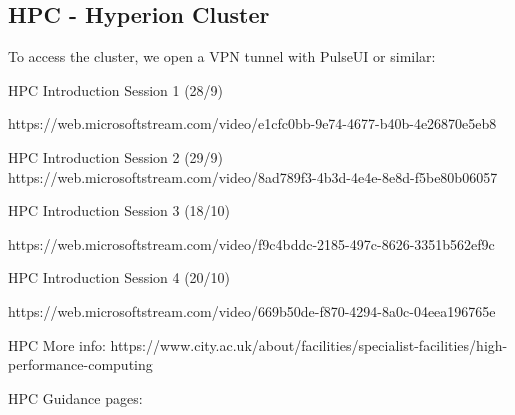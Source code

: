 \subsection{HPC - Hyperion Cluster}
To access the cluster, we open a VPN tunnel with PulseUI or similar:








HPC Introduction Session 1 (28/9)

https://web.microsoftstream.com/video/e1cfc0bb-9e74-4677-b40b-4e26870e5eb8

 

HPC Introduction Session 2 (29/9)
https://web.microsoftstream.com/video/8ad789f3-4b3d-4e4e-8e8d-f5be80b06057

 

HPC Introduction Session 3 (18/10)

https://web.microsoftstream.com/video/f9c4bddc-2185-497c-8626-3351b562ef9c

HPC Introduction Session 4 (20/10)

https://web.microsoftstream.com/video/669b50de-f870-4294-8a0c-04eea196765e

HPC More info:
https://www.city.ac.uk/about/facilities/specialist-facilities/high-performance-computing

HPC Guidance pages:
